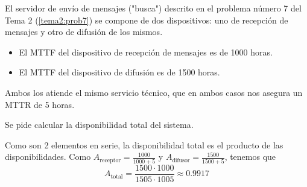\begin{problem}[3]
El servidor de envío de mensajes ("busca") descrito en el problema número 7 del Tema 2 (\ref{tema2:prob7}) se compone de dos dispositivos: uno de recepción de mensajes y otro de difusión de los mismos.
\begin{itemize}
\item El MTTF del dispositivo de recepción de mensajes es de 1000 horas.
\item El MTTF del dispositivo de difusión es de 1500 horas.
\end{itemize}
Ambos los atiende el mismo servicio técnico, que en ambos casos nos asegura un MTTR de 5 horas.

Se pide calcular la disponibilidad total del sistema.

\solution

Como son 2 elementos en serie, la disponibilidad total es el producto de las disponibilidades. Como $ A_{\text{receptor}} = \frac{1000}{1000+5}$ y $A_{\text{difusor}} = \frac{1500}{1500+5}$, tenemos que \[ A_{\text{total}} = \frac{1500\cdot1000}{1505\cdot1005} \approx 0.9917 \]

\end{problem}

